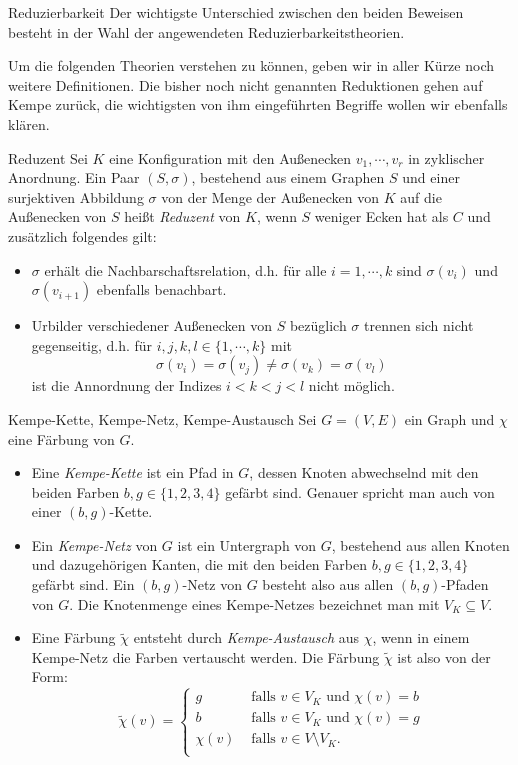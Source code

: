 \begin{section}{Reduzierbarkeit}
 \label{sec:AHRed}
 Der wichtigste Unterschied zwischen den beiden Beweisen besteht in der Wahl der angewendeten Reduzierbarkeitstheorien. 
 
 Um die folgenden Theorien verstehen zu können, geben wir in aller Kürze noch weitere Definitionen. Die bisher noch nicht genannten Reduktionen gehen auf Kempe zurück, die wichtigsten von ihm eingeführten Begriffe wollen wir ebenfalls klären.
 
 \begin{definition}{Reduzent}
  Sei $K$ eine Konfiguration mit den Außenecken $v_1,\cdots,v_r$ in zyklischer Anordnung. Ein Paar $(S,\sigma)$, bestehend aus einem Graphen $S$ und einer surjektiven Abbildung $\sigma$ von der Menge der Außenecken von $K$ auf die Außenecken von $S$ heißt \textit{Reduzent} von $K$, wenn $S$ weniger Ecken hat als $C$ und zusätzlich folgendes gilt:
  \begin{itemize}
   \item $\sigma$ erhält die Nachbarschaftsrelation, d.h. für alle $i = 1,\cdots,k$ sind $\sigma(v_i)$ und $\sigma(v_{i+1})$ ebenfalls benachbart.
   \item Urbilder verschiedener Außenecken von $S$ bezüglich $\sigma$ trennen sich nicht gegenseitig, d.h. für $i,j,k,l \in \{1,\cdots,k\}$ mit
   \[ \sigma(v_i) = \sigma(v_j) \neq \sigma(v_k) = \sigma(v_l)\]
   ist die Annordnung der Indizes $i < k < j < l$ nicht möglich.
  \end{itemize}
 \end{definition}
 
 \begin{definition}{Kempe-Kette, Kempe-Netz, Kempe-Austausch}
  Sei $G = (V,E)$ ein Graph und $\chi$ eine Färbung von $G$.
  \begin{itemize}
   \item Eine \textit{Kempe-Kette} ist ein Pfad in $G$, dessen Knoten abwechselnd mit den beiden Farben $b,g \in \{1,2,3,4\}$ gefärbt sind. Genauer spricht man auch von einer $(b,g)$-Kette.
   \item Ein \textit{Kempe-Netz} von $G$ ist ein Untergraph von $G$, bestehend aus allen Knoten und dazugehörigen Kanten, die mit den beiden Farben $b,g \in \{1,2,3,4\}$ gefärbt sind. Ein $(b,g)$-Netz von $G$ besteht also aus allen $(b,g)$-Pfaden von $G$. Die Knotenmenge eines Kempe-Netzes bezeichnet man mit $V_K\subseteq V$.
   \item Eine Färbung $\tilde{\chi}$ entsteht durch \textit{Kempe-Austausch} aus $\chi$, wenn in einem Kempe-Netz die Farben vertauscht werden. Die Färbung $\tilde{\chi}$ ist also von der Form:
   \[ \tilde{\chi}(v) = \begin{cases}
                        g &\text{ falls } v\in V_K \text{ und } \chi(v) = b\\
                        b &\text{ falls } v\in V_K \text{ und } \chi(v) = g\\
                        \chi(v) &\text{ falls } v\in V\setminus V_K\text{.} \\
                       \end{cases} \]
  \end{itemize}


\end{definition}
\end{section}
